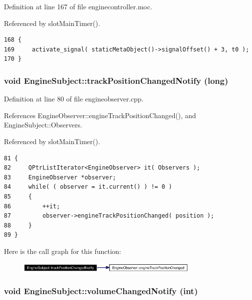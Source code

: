Definition at line 167 of file enginecontroller.moc.

Referenced by slot\-Main\-Timer().



\footnotesize\begin{verbatim}168 {
169     activate_signal( staticMetaObject()->signalOffset() + 3, t0 );
170 }
\end{verbatim}\normalsize 
{}
\subsubsection{\setlength{\rightskip}{0pt plus 5cm}void Engine\-Subject::track\-Position\-Changed\-Notify (long)\hspace{0.3cm}{\tt  [protected, inherited]}}\label{classEngineSubject_EngineSubjectb5}




Definition at line 80 of file engineobserver.cpp.

References Engine\-Observer::engine\-Track\-Position\-Changed(), and Engine\-Subject::Observers.

Referenced by slot\-Main\-Timer().



\footnotesize\begin{verbatim}81 {
82     QPtrListIterator<EngineObserver> it( Observers );
83     EngineObserver *observer;
84     while( ( observer = it.current() ) != 0 )
85     {
86         ++it;
87         observer->engineTrackPositionChanged( position );
88     }
89 }
\end{verbatim}\normalsize 


Here is the call graph for this function:\begin{figure}[H]
\begin{center}
\leavevmode
\includegraphics[width=253pt]{classEngineSubject_EngineSubjectb5_cgraph}
\end{center}
\end{figure}
\subsubsection{\setlength{\rightskip}{0pt plus 5cm}void Engine\-Subject::volume\-Changed\-Notify (int)\hspace{0.3cm}{\tt  [protected, inherited]}}\label{classEngineSubject_EngineSubjectb4}




